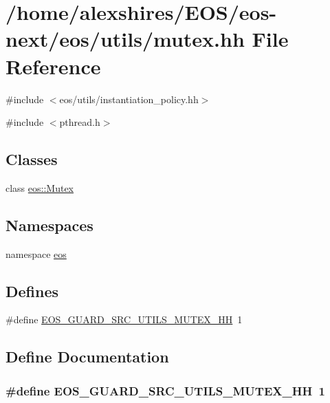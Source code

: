 \hypertarget{mutex_8hh}{
\section{/home/alexshires/EOS/eos-\/next/eos/utils/mutex.hh File Reference}
\label{mutex_8hh}
}
{\ttfamily \#include $<$eos/utils/instantiation\_\-policy.hh$>$}\par
{\ttfamily \#include $<$pthread.h$>$}\par
\subsection*{Classes}
\begin{DoxyCompactItemize}
\item 
class \hyperlink{classeos_1_1Mutex}{eos::Mutex}
\end{DoxyCompactItemize}
\subsection*{Namespaces}
\begin{DoxyCompactItemize}
\item 
namespace \hyperlink{namespaceeos}{eos}
\end{DoxyCompactItemize}
\subsection*{Defines}
\begin{DoxyCompactItemize}
\item 
\#define \hyperlink{mutex_8hh_a79f0d7f86442f8f490dec37851f8a27e}{EOS\_\-GUARD\_\-SRC\_\-UTILS\_\-MUTEX\_\-HH}~1
\end{DoxyCompactItemize}


\subsection{Define Documentation}
\hypertarget{mutex_8hh_a79f0d7f86442f8f490dec37851f8a27e}{
\subsubsection[{EOS\_\-GUARD\_\-SRC\_\-UTILS\_\-MUTEX\_\-HH}]{\setlength{\rightskip}{0pt plus 5cm}\#define EOS\_\-GUARD\_\-SRC\_\-UTILS\_\-MUTEX\_\-HH~1}}
\label{mutex_8hh_a79f0d7f86442f8f490dec37851f8a27e}
